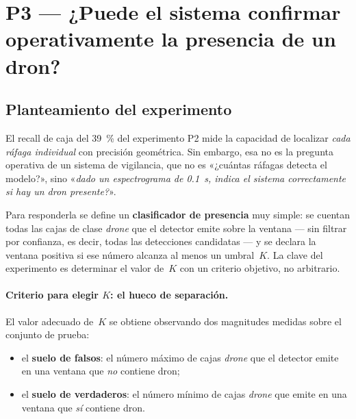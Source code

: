 \section{P3 --- ¿Puede el sistema confirmar operativamente la presencia de un dron?}
\label{sec:bloque_presencia}

\subsection{Planteamiento del experimento}
\label{sec:p3_planteamiento}

El recall de caja del \SI{39}{\percent} del experimento P2 mide la capacidad de localizar \emph{cada ráfaga individual} con precisión geométrica. Sin embargo, esa no es la pregunta operativa de un sistema de vigilancia, que no es «¿cuántas ráfagas detecta el modelo?», sino «\emph{dado un espectrograma de \SI{0.1}{\second}, indica el sistema correctamente si hay un dron presente?}».

Para responderla se define un \textbf{clasificador de presencia} muy simple: se cuentan todas las cajas de clase \emph{drone} que el detector emite sobre la ventana --- sin filtrar por confianza, es decir, todas las detecciones candidatas --- y se declara la ventana positiva si ese número alcanza al menos un umbral~$K$. La clave del experimento es determinar el valor de~$K$ con un criterio objetivo, no arbitrario.

\paragraph{Criterio para elegir $K$: el hueco de separación.}
El valor adecuado de~$K$ se obtiene observando dos magnitudes medidas sobre el conjunto de prueba:

\begin{itemize}
  \item el \textbf{suelo de falsos}: el número máximo de cajas \emph{drone} que el detector emite en una ventana que \emph{no} contiene dron;
  \item el \textbf{suelo de verdaderos}: el número mínimo de cajas \emph{drone} que emite en una ventana que \emph{sí} contiene dron.
\end{itemize}

